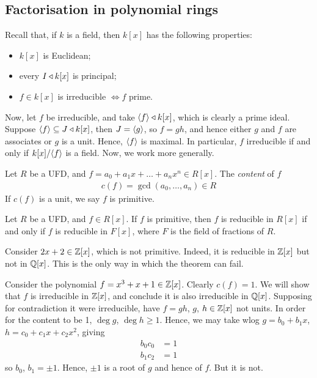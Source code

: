 \documentclass{../../template/note}
\begin{document}
    \subsection{Factorisation in polynomial rings}

    Recall that, if $k$ is a field, then $k[x]$ has the following properties:
    \begin{itemize}
        \item $k[x]$ is Euclidean;
        \item every $I \triangleleft k[x]$ is principal;
        \item $f \in k[x]$ is irreducible $\iff f$ prime.
    \end{itemize}
    
    Now, let $f$ be irreducible, and take $\left \langle f \right \rangle \triangleleft k[x]$, which is clearly a prime ideal. Suppose $\left \langle f \right \rangle \subseteq J \triangleleft k[x]$, then $J = \left \langle g \right \rangle$, so $f = gh$, and hence either $g$ and $f$ are associates or $g$ is a unit. Hence, $\left \langle f \right \rangle$ is maximal. In particular, $f$ irreducible if and only if $k[x] /\!\left \langle f \right \rangle$ is a field. Now, we work more generally.
    
    \begin{definition}
        Let $R$ be a UFD, and $f = a_0 + a_1x + \dots + a_nx^n \in R[x]$. The \emph{content} of $f$
        \begin{align*}
            c(f) = \gcd(a_0, \dots, a_n) \in R
        \end{align*}
        If $c(f)$ is a unit, we say $f$ is primitive.        
    \end{definition}
    
    \begin{theorem}
        Let $R$ be a UFD, and $f \in R[x]$. If $f$ is primitive, then $f$ is reducible in $R[x]$ if and only if $f$ is reducible in $F[x]$, where $F$ is the field of fractions of $R$.
    \end{theorem}
    
    \begin{example*}
        Consider $2x+2 \in \mathbb Z[x]$, which is not primitive. Indeed, it is reducible in $\mathbb Z[x]$ but not in $\mathbb Q[x]$. This is the only way in which the theorem can fail.
    \end{example*}

    
    \begin{example*}
        Consider the polynomial $f = x^3+x+1 \in \mathbb Z[x]$. Clearly $c(f) = 1$. We will show that $f$ is irreducible in $\mathbb Z[x]$, and conclude it is also irreducible in $\mathbb Q[x]$. Supposing for contradiction it were irreducible, have $f=gh$, $g$, $h \in \mathbb Z[x]$ not units. In order for the content to be 1, $\deg g$, $\deg h \geq 1$. Hence, we may take wlog $g = b_0 + b_1x$, $h = c_0 + c_1x + c_2x^2$, giving
        \begin{align*}
            b_0c_0 &= 1 \\
            b_1c_2 &= 1
        \end{align*}
        so $b_0$, $b_1 = \pm 1$. Hence, $\pm 1$ is a root of $g$ and hence of $f$. But it is not.        
    \end{example*}
    
\end{document}
